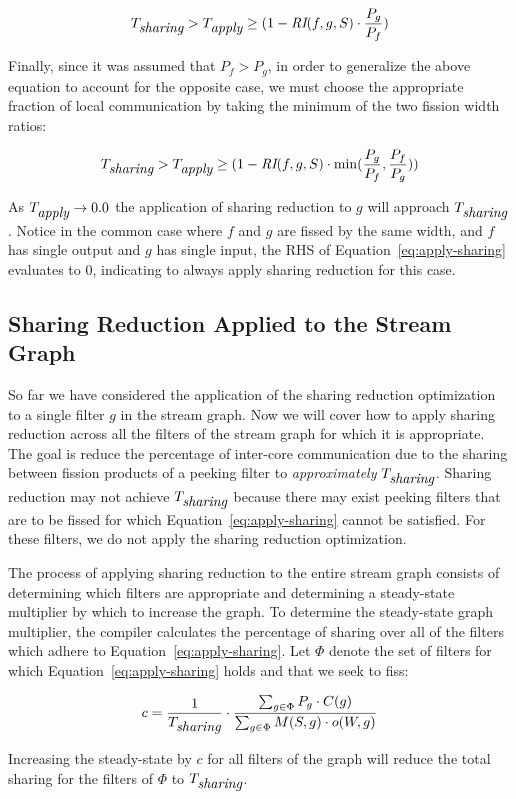 \begin{equation}
T_{\mbox{\it sharing}}  >  T_{\mbox{\it apply}} \ge (1 -\mbox{\it RI}(f,g, S) \cdot
\frac{P_g}{P_f})
\end{equation}

Finally, since it was assumed that $P_f > P_g$, in order to generalize
the above equation to account for the opposite case, we must choose
the appropriate fraction of local communication by taking the minimum
of the two fission width ratios:

\begin{equation}
\label{eq:apply-sharing}
T_{\mbox{\it sharing}}  >  T_{\mbox{\it apply}} \ge (1 -\mbox{\it RI}(f,g, S) \cdot
\min(\frac{P_g}{P_f}, \frac{P_f}{P_g}))
\end{equation}

\noindent As $T_{\mbox{\it apply}} \rightarrow 0.0$ the application of
sharing reduction to $g$ will approach $T_{\mbox{\it sharing}}$. Notice in
the common case where $f$ and $g$ are fissed by the same width, and
$f$ has single output and $g$ has single input, the RHS of
Equation~\ref{eq:apply-sharing} evaluates to 0, indicating to always
apply sharing reduction for this case.

\subsection{Sharing Reduction Applied to the Stream Graph}
So far we have considered the application of the sharing reduction
optimization to a single filter $g$ in the stream graph.  Now we will
cover how to apply sharing reduction across all the filters of the
stream graph for which it is appropriate.  The goal is reduce the
percentage of inter-core communication due to the sharing between
fission products of a peeking filter to {\it approximately}
$T_{\mbox{\it sharing}}$.  Sharing reduction may not achieve
$T_{\mbox{\it sharing}}$ because there may exist peeking filters that are to
be fissed for which Equation~\ref{eq:apply-sharing} cannot be
satisfied.  For these filters, we do not apply the sharing reduction
optimization.

The process of applying sharing reduction to the entire stream graph
consists of determining which filters are appropriate and determining
a steady-state multiplier by which to increase the graph.  To
determine the steady-state graph multiplier, the compiler calculates
the percentage of sharing over all of the filters which adhere to
Equation~\ref{eq:apply-sharing}.  Let $\Phi$ denote the set of filters
for which Equation~\ref{eq:apply-sharing} holds and that we seek to
fiss:

\begin{equation}
\label{eq:sr-mult}
c = \frac{1}{T_{\mbox{\it sharing}}} \cdot \frac{\sum_{g \in \Phi} P_g \cdot C(g) }{\sum _{g \in
    \Phi} M(S, g) \cdot o(W, g)}
\end{equation}

\noindent Increasing the steady-state by $c$ for all filters of the
graph will reduce the total sharing for the filters of $\Phi$ to
$T_{\mbox{\it sharing}}$.  